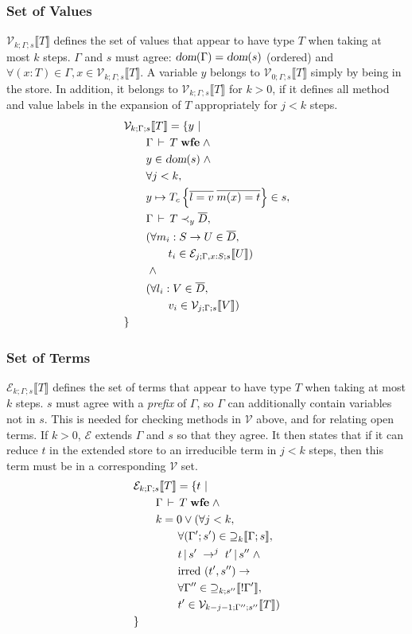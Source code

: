 \documentclass[9pt]{sigplanconf}
\newcommand{\gap}{\quad\quad}
\newcommand{\ts}{\,\vdash\,}
\newcommand{\dom}{\mbox{\sl dom}}
\newcommand{\expand}{\prec}
\newcommand{\wfe}{\;\mbox{\textbf{wfe}}}
\newcommand{\ldefs}[1]{\left\{#1\right\}}
\newcommand{\seq}[1]{\overline{#1}}
\newcommand{\envplus}[1]{, #1}
\newcommand{\relv}[4]{\mathcal{V}_{#1;#2;#3}\llbracket#4\rrbracket}
\newcommand{\rele}[4]{\mathcal{E}_{#1;#2;#3}\llbracket#4\rrbracket}
\newcommand{\rels}[3]{\mathcal{\supseteq}_{#1}\llbracket#2;#3\rrbracket}
\newcommand{\relg}[3]{\mathcal{\supseteq}_{#1;#2}\llbracket!#3\rrbracket}
\newcommand{\irred}[2]{\text{irred }(#1,#2)}
\newcommand{\andl}{\;\wedge\;}
\newcommand{\orl}{\vee}
\newcommand{\impliesl}{\rightarrow}
\newcommand{\reductionl}[5]{#1 \operatorname{|} #2 \;\rightarrow^{#5}\; #3 \operatorname{|} #4}
\begin{document}
\subsubsection{Set of Values}
$\relv k \Gamma s T$ defines the set of values that appear to have
type $T$ when taking at most $k$ steps. $\Gamma$ and $s$ must agree:
$\dom(\Gamma) = \dom(s)$ (ordered) and $\forall (x : T) \in \Gamma, x
\in \relv k \Gamma s T$. A variable $y$ belongs to $\relv 0 \Gamma s
T$ simply by being in the store. In addition, it belongs to $\relv k
\Gamma s T$ for $k > 0$, if it defines all method and value labels in
the expansion of $T$ appropriately for $j < k$ steps.
\begin{align*}
&\relv k \Gamma s T = \{ y \ |\\
&\gap \Gamma \ts T \wfe \andl\\
&\gap y \in \dom(s) \andl\\
&\gap \forall j < k,\\
&\gap y \mapsto T_c \ldefs{\seq{l = v}\;\seq{m(x)=t}} \in s,\\
&\gap \Gamma \ts T \expand_y \seq{D},\\
&\gap (\forall m_i : S \rightarrow U \in \seq{D},\\
&\gap\gap t_i \in \rele j {\Gamma \envplus{x : S}} s U)\\
&\gap \andl\\
&\gap (\forall l_i : V \in \seq{D},\\
&\gap\gap v_i \in \relv j \Gamma s V)\\
&\}
\end{align*}

\subsubsection{Set of Terms}
$\rele k \Gamma s T$ defines the set of terms that appear to have type
$T$ when taking at most $k$ steps. $s$ must agree with a {\it prefix}
of $\Gamma$, so $\Gamma$ can additionally contain variables not in
$s$. This is needed for checking methods in $\mathcal{V}$ above, and
for relating open terms. If $k > 0$, $\mathcal{E}$ extends $\Gamma$
and $s$ so that they agree. It then states that if it can reduce $t$
in the extended store to an irreducible term in $j < k$ steps, then
this term must be in a corresponding $\mathcal{V}$ set.
\begin{align*}
&\rele k \Gamma s T = \{ t \ |\\
&\gap \Gamma \ts T \wfe \andl\\
&\gap k = 0 \orl (\forall j < k,\\
&\gap\gap \forall (\Gamma'; s') \in \rels k \Gamma s ,\\
&\gap\gap \reductionl t {s'} {t'} {s''} j \andl\\
&\gap\gap \irred {t'} {s''} \impliesl\\
&\gap\gap \forall \Gamma'' \in \relg k {s''} {\Gamma'} ,\\
&\gap\gap {t'} \in \relv {k-j-1} {\Gamma''} {s''} T)\\
&\}
\end{align*}
\end{document}
